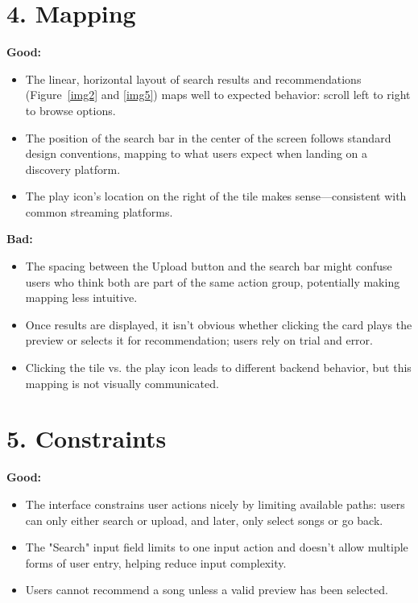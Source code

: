 \documentclass[12pt]{article}
\begin{document}
\section*{4. Mapping}

\noindent\textbf{Good:}
\begin{itemize}
    \item The linear, horizontal layout of search results and recommendations (Figure~\ref{img2} and \ref{img5}) maps well to expected behavior: scroll left to right to browse options.
    \item The position of the search bar in the center of the screen follows standard design conventions, mapping to what users expect when landing on a discovery platform.
    \item The play icon’s location on the right of the tile makes sense—consistent with common streaming platforms.
\end{itemize}

\noindent\textbf{Bad:}
\begin{itemize}
    \item The spacing between the Upload button and the search bar might confuse users who think both are part of the same action group, potentially making mapping less intuitive.
    \item Once results are displayed, it isn’t obvious whether clicking the card plays the preview or selects it for recommendation; users rely on trial and error.
    \item Clicking the tile vs. the play icon leads to different backend behavior, but this mapping is not visually communicated.
\end{itemize}


\section*{5. Constraints}

\noindent\textbf{Good:}
\begin{itemize}
    \item The interface constrains user actions nicely by limiting available paths: users can only either search or upload, and later, only select songs or go back.
    \item The "Search" input field limits to one input action and doesn’t allow multiple forms of user entry, helping reduce input complexity.
    \item Users cannot recommend a song unless a valid preview has been selected.
\end{itemize}
\end{document}
